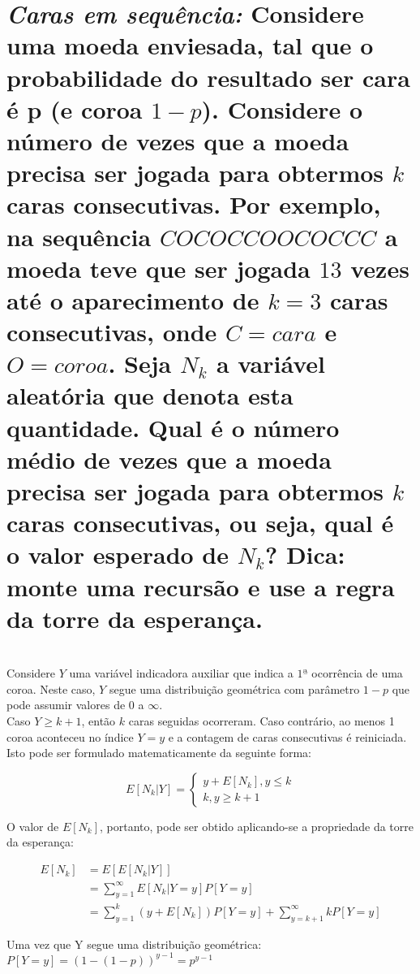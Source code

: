 \documentclass[a4paper]{article}
\begin{document}
\section{\textit{Caras em sequência: } Considere uma moeda enviesada, tal que o probabilidade do resultado ser cara é p (e coroa $1-p$). Considere o número de vezes que a moeda precisa ser jogada para obtermos $k$ caras consecutivas. Por exemplo, na sequência $COCOCCOOCOCCC$ a moeda teve que ser jogada $13$ vezes até o aparecimento de $k = 3$ caras consecutivas, onde $C = cara$ e $O = coroa$. Seja $N_k$ a variável aleatória que denota esta quantidade. Qual é o número médio de vezes que a moeda precisa ser jogada para obtermos $k$ caras consecutivas, ou seja, qual é o valor esperado de $N_k$? Dica: monte uma recursão e use a regra da torre da esperança.}\\

Considere $Y$ uma variável indicadora auxiliar que indica a $1ª$ ocorrência de uma coroa. Neste caso, $Y$ segue uma distribuição geométrica com parâmetro $1-p$ que pode assumir valores de $0$ a $\infty$.\\

Caso $Y \geq k + 1$, então $k$ caras seguidas ocorreram. Caso contrário, ao menos 1 coroa aconteceu no índice $Y = y$ e a contagem de caras consecutivas é reiniciada. \\

Isto pode ser formulado matematicamente da seguinte forma: 


\[
    E[N_k|Y] = \left\{
                \begin{array}{ll}
                  y+E[N_k], y \leq k\\
                  k, y \geq k + 1
                \end{array}
              \right.
  \]
  
  O valor de $E[N_k]$, portanto, pode ser obtido aplicando-se a propriedade da torre da esperança: 
  
  \begin{equation*}
    \begin{split}
        E[N_k] &= E[E[N_k|Y]]  \\
            &= \sum_{y = 1}^\infty E[N_k|Y = y]P[Y = y]\\
            &= \sum_{y = 1}^k(y + E[N_k])P[Y = y] + \sum_{y = k+1}^\infty kP[Y = y]
    \end{split}
  \end{equation*}
  
  Uma vez que Y segue uma distribuição geométrica: $P[Y = y] = (1-(1-p))^{y-1} = p^{y-1}$
  
\end{document}
